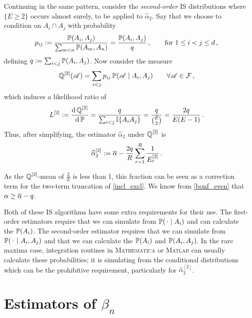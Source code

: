Continuing in the same pattern, consider the \emph{second-order} IS distributions where $\{E \geq 2\}$ occurs almost surely, to be applied to $\hat{\alpha}_2$.
Say that we choose to condition on $A_i \cap A_j$ with probability
\[ p_{ij} := \frac{\operatorname{{\mathbb P}}(A_i,A_j)}{ \sum_{m<n} \operatorname{{\mathbb P}}(A_m,A_n) } = \frac{\operatorname{{\mathbb P}}(A_i,A_j)}{ q } \,,\qquad \text{for } 1 \le i < j \le d\,, \]
defining ${q} := \sum_{i<j} \operatorname{{\mathbb P}}(A_i, A_j)$. Now consider the measure
\[ \operatorname{\mathbb Q}^{[2]}( \mathscr{A} ) = \sum_{i<j} p_{ij} \operatorname{{\mathbb P}}( \mathscr{A} \mid A_i, A_j)  \qquad \forall \mathscr{A} \in \mathcal{F} \,, \]
which induces a likelihood ratio of
\[ L^{[2]} := \frac{\mathop{}\!\mathrm{d} \operatorname{\mathbb Q}^{[2]} }{ \mathop{}\!\mathrm{d} \operatorname{{\mathbb P}} } = \frac{ {q} }{ \sum_{i<j} \mathbb{I}\{ A_iA_j \}}
  = \frac{ {q} }{ \binom{ E }{2} } = \frac{2 {q} }{ E (E - 1) }  \,. \]
Thus, after simplifying, the estimator $\hat{\alpha}_2$ under $\operatorname{\mathbb Q}^{[2]}$ is
\begin{align} \label{alpha_2_IS_2}
  \widehat{\alpha}_{2}^{[2]} :=
  \overline{\alpha} -  \frac{2q}{R} \sum_{r=1}^R \frac{1}{E_r^{[2]}} \,.
\end{align}

\begin{remark}
As the $\operatorname{\mathbb Q}^{[2]}$-mean of $\frac2{E}$ is less than 1, this fraction can be seen as a correction term for the two-term truncation of \eqref{incl_excl}. We know from \eqref{bonf_even} that $\alpha \ge \overline{\alpha} - q$. \remQED
\end{remark}

Both of these IS algorithms have some extra requirements for their use. The first-order estimators require
that we can simulate from $\operatorname{{\mathbb P}}(\,\cdot \mid A_i)$ and can calculate the $\operatorname{{\mathbb P}}(A_i)$.
The second-order estimator requires that we
can simulate from $\operatorname{{\mathbb P}}(\,\cdot~|~A_i, A_j)$ and that we can calculate the $\operatorname{{\mathbb P}}(A_i)$ and $\operatorname{{\mathbb P}}(A_i, A_j)$.
In the rare maxima case, integration routines in \textsc{Mathematica} or \textsc{Matlab} can usually calculate these probabilities; it is simulating from the conditional distributions which can be the prohibitive requirement, particularly for $\hat{\alpha}_{2}^{[2]}$.

\section{Estimators of $\beta_n$} \label{scn:beta_ests}

